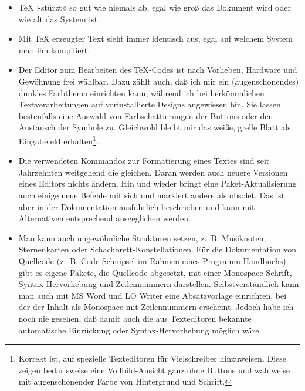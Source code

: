 \documentclass[11pt,a4paper,ngerman,DIV=8]{scrartcl}
\begin{document}
\begin{itemize}
\begin{itemize}
    \item Die Nutzung des \texttt{csquotes}-Pakets vorausgesetzt, werden Anführungszeichen nicht mehr manuell eingegeben, sondern das Wort wird mit einem Befehl eingeklammert. Nur am Dokumentanfang wird definiert, welche Form von Anführungszeichen verwendet werden sollen (deutsch/englisch, einfach/doppelt etc.). Beim Kompilieren werden diese nach Vorgabe gesetzt, und können ebenso einfach, dokumentweit!, ausgetauscht werden. Durch die Einklammerung ist außerdem ausgeschlossen, daß man versehentlich nur das eine Anführungszeichen setzt und das zweite vergißt.
    \item Literaturverwaltung zusammen mit Bib\TeX{} bzw. Bib\LaTeX{}: Literatur in einer Datenbank, eindeutige Schlüssel werden im Quellcode zitiert; verwaiste Zitate im Mengentext oder überflüssige Einträge im Literaturverzeichnis sind gar nicht möglich! Korrekte Sortierung der Einträge und einheitliche Formatierung werden durch Automatismen und einen ausgewählten, eindeutigen Zitierstil übernommen.
  \end{itemize}
  \item \TeX{} »stürzt« so gut wie niemals ab, egal wie groß das Dokument wird oder wie alt das System ist.
  \item Mit \TeX{} erzeugter Text sieht immer identisch aus, egal auf welchem System man ihn kompiliert.
  \item Der Editor zum Bearbeiten des \TeX{}-Codes ist nach Vorlieben, Hardware und Gewöhnung frei wählbar. Dazu zählt auch, daß ich mir ein (augenschonendes) dunkles Farbthema einrichten kann, während ich bei herkömmlichen Textverarbeitungen auf vorinstallierte Designs angewiesen bin. Sie lassen bestenfalls eine Auswahl von Farbschattierungen der Buttons oder den Austausch der Symbole zu. Gleichwohl bleibt mir das weiße, grelle Blatt als Eingabefeld erhalten\footnote{Korrekt ist, auf spezielle Texteditoren für Vielschreiber hinzuweisen. Diese zeigen bedarfsweise eine Vollbild-Ansicht ganz ohne Buttons und wahlweise mit augenschonender Farbe von Hintergrund und Schrift.}.
  \item Die verwendeten Kommandos zur Formatierung eines Textes sind seit Jahrzehnten weitgehend die gleichen. Daran werden auch neuere Versionen eines Editors nichts ändern. Hin und wieder bringt eine Paket-Aktualisierung auch einige neue Befehle mit sich und markiert andere als obsolet. Das ist aber in der Dokumentation ausführlich beschrieben und kann mit Alternativen entsprechend ausgeglichen werden.
  \item Man kann auch ungewöhnliche Strukturen setzen, z.~B. Musiknoten, Sternenkarten oder Schachbrett-Konstellationen. Für die Dokumentation von Quellcode (z.~B. Code-Schnipsel im Rahmen eines Programm-Handbuchs) gibt es eigene Pakete, die Quellcode abgesetzt, mit einer Monospace-Schrift, Syntax-Hervorhebung und Zeilennummern darstellen. Selbstverständlich kann man auch mit MS Word und LO Writer eine Absatzvorlage einrichten, bei der der Inhalt als Monospace mit Zeilennummern erscheint. Jedoch habe ich noch nie gesehen, daß damit auch die aus Texteditoren bekannte automatische Einrückung oder Syntax-Hervorhebung möglich wäre.

\end{itemize}
\end{document}
